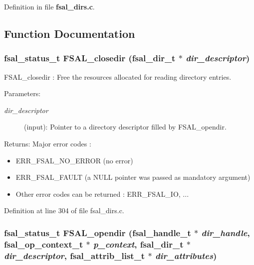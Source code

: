 Definition in file {\bf fsal\_\-dirs.c}.

\subsection{Function Documentation}
\subsubsection{\setlength{\rightskip}{0pt plus 5cm}fsal\_\-status\_\-t FSAL\_\-closedir (fsal\_\-dir\_\-t $\ast$ {\em dir\_\-descriptor})}\label{fsal__dirs_8c_a2}


FSAL\_\-closedir : Free the resources allocated for reading directory entries.

\begin{Desc}
\item[Parameters:]
\begin{description}
\item[{\em dir\_\-descriptor}](input): Pointer to a directory descriptor filled by FSAL\_\-opendir.\end{description}
\end{Desc}
\begin{Desc}
\item[Returns:]Major error codes :\begin{itemize}
\item ERR\_\-FSAL\_\-NO\_\-ERROR (no error)\item ERR\_\-FSAL\_\-FAULT (a NULL pointer was passed as mandatory argument)\item Other error codes can be returned : ERR\_\-FSAL\_\-IO, ... \end{itemize}
\end{Desc}


Definition at line 304 of file fsal\_\-dirs.c.
\subsubsection{\setlength{\rightskip}{0pt plus 5cm}fsal\_\-status\_\-t FSAL\_\-opendir (fsal\_\-handle\_\-t $\ast$ {\em dir\_\-handle}, fsal\_\-op\_\-context\_\-t $\ast$ {\em p\_\-context}, fsal\_\-dir\_\-t $\ast$ {\em dir\_\-descriptor}, fsal\_\-attrib\_\-list\_\-t $\ast$ {\em dir\_\-attributes})}\label{fsal__dirs_8c_a0}


